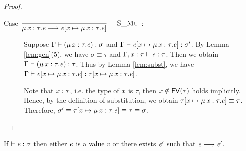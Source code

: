 \begin{proof}
\begin{description}
        \item[Case ${\displaystyle\frac{\begin{array}{l} \end{array}}{ \mu \, \mathit{x} : \tau . \mathit{e} \longrightarrow \mathit{e} [ \mathit{x} \mapsto \mu \, \mathit{x} : \tau . \mathit{e} ]}\quad\textsc{ {\textsc{S\_Mu}}{} }}$:] $\quad$ \\
        Suppose $\Gamma  \vdash  (  \mu \, \mathit{x}  :  \tau  .  \mathit{e}  )  :  \sigma$ and $\Gamma  \vdash  \mathit{e}  [  \mathit{x}  \mapsto  \mu \, \mathit{x}  :  \tau  .  \mathit{e}  ]  :  \sigma'$. By Lemma \ref{lem:gen}(5), we have $\sigma  \equiv  \tau$ and $\Gamma  ,  \mathit{x}  :  \tau  \vdash  \mathit{e}  :  \tau$. Then we obtain $\Gamma  \vdash  (  \mu \, \mathit{x}  :  \tau  .  \mathit{e}  )  :  \tau$. Thus by Lemma \ref{lem:subst}, we have $\Gamma  \vdash  \mathit{e}  [  \mathit{x}  \mapsto  \mu \, \mathit{x}  :  \tau  .  \mathit{e}  ]  :  \tau  [  \mathit{x}  \mapsto  \mu \, \mathit{x}  :  \tau  .  \mathit{e}  ]$.
        
        Note that $\mathit{x}:\tau$, i.e. the type of $\mathit{x}$ is $\tau$, then $\mathit{x} \notin \mathsf{FV}(\tau)$ holds implicitly. Hence, by the definition of substitution, we obtain $\tau  [  \mathit{x}  \mapsto  \mu \, \mathit{x}  :  \tau  .  \mathit{e}  ]  \equiv  \tau$. Therefore, $\sigma'  \equiv  \tau  [  \mathit{x}  \mapsto  \mu \, \mathit{x}  :  \tau  .  \mathit{e}  ]  \equiv  \tau  \equiv  \sigma$.
    \end{description}
\end{proof}

\begin{lem}[Progress]
If $\vdash  \mathit{e}  :  \sigma$ then either $\mathit{e}$ is a value $v$ or there exists $\mathit{e}'$ such that $\mathit{e}  \longrightarrow  \mathit{e'}$.
\end{lem}

